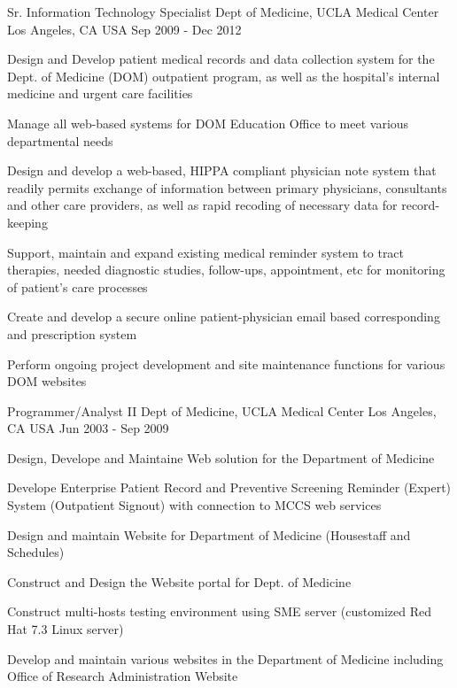 \begin{cventries}
  \cventry
    {Sr. Information Technology Specialist} %
    {Dept of Medicine, UCLA Medical Center} %
    {Los Angeles, CA USA} %
    {Sep 2009 - Dec 2012} %
    {
      \begin{cvitems} %
        \item {Design and Develop patient medical records and data collection system for the Dept. of Medicine (DOM) outpatient program, as well as the hospital's internal medicine and urgent care facilities}
        \item {Manage all web-based systems for DOM Education Office to meet various departmental needs}      
		 \item {Design and develop a web-based, HIPPA compliant physician note system that readily permits exchange of information between primary physicians, consultants and other care providers, as well as rapid recoding of necessary data for record-keeping} 
		 \item{Support, maintain and expand existing medical reminder system to tract therapies, needed diagnostic studies, follow-ups, appointment, etc for monitoring of patient's care processes}  
		 \item{Create and develop a secure online patient-physician email based corresponding and prescription system}
		 \item{Perform ongoing project development and site maintenance functions for various DOM websites}
      \end{cvitems}
    }

 \cventry
    {Programmer/Analyst II} %
    {Dept of Medicine, UCLA Medical Center} %
    {Los Angeles, CA USA} %
    {Jun 2003 - Sep 2009} %
    {
      \begin{cvitems} %
        \item {Design, Develope and Maintaine Web solution for the Department of Medicine}
		 \item {Develope Enterprise Patient Record and Preventive Screening Reminder (Expert) System (Outpatient Signout) with connection to MCCS web services}
		  \item {Design and maintain Website for Department of Medicine (Housestaff and Schedules)}
		  \item {Construct and Design the Website portal for Dept. of Medicine}
		   \item {Construct multi-hosts testing environment using SME server (customized Red Hat 7.3 Linux server)}
		   \item {Develop and maintain various websites in the Department of Medicine including Office of Research Administration Website}
      \end{cvitems}
    }


\end{cventries}
